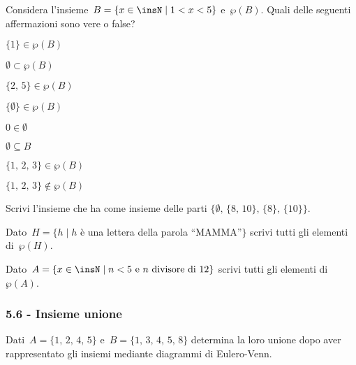 \begin{esercizio}
 \label{ese:5.48}
Considera l'insieme~$B=\{x\in\insN\mid 1<x<5\}$
e~$\wp (B)$. Quali delle seguenti affermazioni sono vere o false?
\begin{multicols}{2}
\TabPositions{4cm}
\begin{enumeratea}
 \item $\{1\}\in\wp (B)$ \tab\boxV\quad\boxF
 \item $\emptyset\subset\wp (B)$ \tab\boxV\quad\boxF
 \item $\{\text{2, 5}\}\in\wp (B)$ \tab\boxV\quad\boxF
 \item $\{\emptyset\}\in\wp (B)$ \tab\boxV\quad\boxF
 \item $0\in\emptyset $ \tab\boxV\quad\boxF
 \item $\emptyset\subseteq B$ \tab\boxV\quad\boxF
 \item $\{\text{1, 2, 3}\}\in\wp (B)$ \tab\boxV\quad\boxF
 \item $\{\text{1, 2, 3}\}\notin\wp (B)$ \tab\boxV\quad\boxF
\end{enumeratea}
\end{multicols}
\end{esercizio}

\begin{esercizio}
 \label{ese:5.49}
 Scrivi l'insieme che ha come insieme delle parti
$\{\emptyset\text{, }\{\text{8, 10}\}\text{, }\{8\}\text{, }\{10\}\}$.
\end{esercizio}

\begin{esercizio}
 \label{ese:5.50}
Dato~$H=\{h\mid h$ è una lettera della parola ``MAMMA''$\}$ scrivi
tutti gli elementi di~$\wp (H)$.
\end{esercizio}

\begin{esercizio}
 \label{ese:5.51}
 Dato~$A=\{x\in\insN\mid n<5\text{ e }n\text{ divisore di~12}\}$ scrivi tutti gli elementi di
$\wp (A)$.
\end{esercizio}

\subsubsection*{5.6 - Insieme unione}
\begin{esercizio}
 \label{ese:5.52}
Dati~$A=\{\text{1, 2, 4, 5}\}$ e~$B=\{\text{1, 3, 4, 5, 8}\}$ determina la loro unione dopo
aver rappresentato gli insiemi mediante diagrammi di Eulero-Venn.
 \end{esercizio}

